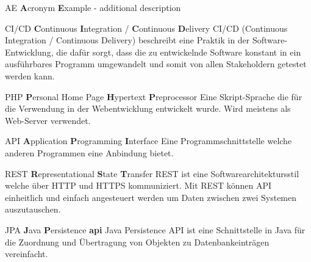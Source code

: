 %
%


\usepackage{xparse}

 {
	\makeglossaries
}





{AE}
{\textbf{A}cronym \textbf{E}xample - additional description}





	{CI/CD}
	{\textbf{C}ontinuous \textbf{I}ntegration / \textbf{C}ontinuous \textbf{D}elivery}
	{
		CI/CD (Continuous Integration / Continuous Delivery) beschreibt eine Praktik in der Software-Entwicklung, die dafür sorgt, dass die zu entwickelnde Software konstant in ein ausführbares Programm umgewandelt und somit von allen Stakeholdern getestet werden kann.
	}

	{PHP}
	{\textbf{P}ersonal Home Page \textbf{H}ypertext \textbf{P}reprocessor}
	{
		Eine Skript-Sprache die für die Verwendung in der Webentwicklung entwickelt wurde. Wird meistens als Web-Server verwendet.
	}

	{API}
	{\textbf{A}pplication \textbf{P}rogramming \textbf{I}nterface}
	{
		Eine Programmschnittstelle welche anderen Programmen eine Anbindung bietet.
	}

	{REST}
	{\textbf{R}epresentational \textbf{S}tate \textbf{T}ransfer}
	{
		REST ist eine Softwarearchitektursstil welche über HTTP und HTTPS kommuniziert. Mit REST können API einheitlich und einfach angesteuert werden um Daten zwischen zwei Systemen auszutauschen.
	}

	{JPA}
	{\textbf{J}ava \textbf{P}ersistence \textbf{\gls{api}}}
	{
		Java Persistence API ist eine Schnittstelle in Java für die Zuordnung und Übertragung von Objekten zu Datenbankeinträgen vereinfacht.
	}

